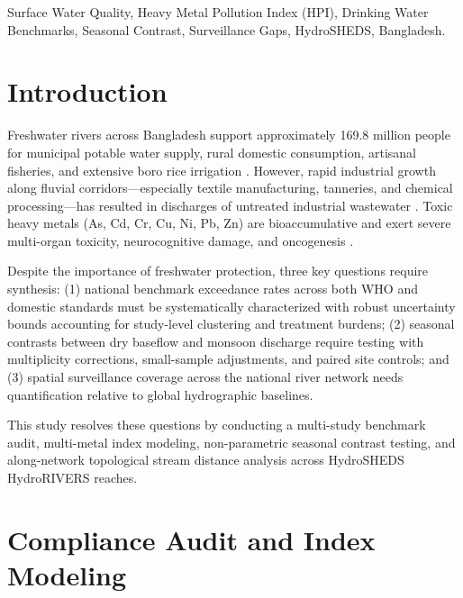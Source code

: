 \documentclass[conference]{IEEEtran}
\begin{document}
\begin{abstract}
surveillance coverage gaps along the Lower Meghna, Padma, and Jamuna river mainstems.
\end{abstract}

\begin{IEEEkeywords}
Surface Water Quality, Heavy Metal Pollution Index (HPI), Drinking Water Benchmarks, Seasonal Contrast, Surveillance Gaps, HydroSHEDS, Bangladesh.
\end{IEEEkeywords}

\section{Introduction}
Freshwater rivers across Bangladesh support approximately 169.8 million people \cite{BBS2022} for municipal potable water supply, rural domestic consumption, artisanal fisheries, and extensive boro rice irrigation \cite{Ali2021,Islam2015}. However, rapid industrial growth along fluvial corridors---especially textile manufacturing, tanneries, and chemical processing---has resulted in discharges of untreated industrial wastewater \cite{Islam2015}. Toxic heavy metals (As, Cd, Cr, Cu, Ni, Pb, Zn) are bioaccumulative and exert severe multi-organ toxicity, neurocognitive damage, and oncogenesis \cite{Jarup2003,Needleman2004}.

Despite the importance of freshwater protection, three key questions require synthesis: (1) national benchmark exceedance rates across both WHO and domestic standards must be systematically characterized with robust uncertainty bounds accounting for study-level clustering and treatment burdens; (2) seasonal contrasts between dry baseflow and monsoon discharge require testing with multiplicity corrections, small-sample adjustments, and paired site controls; and (3) spatial surveillance coverage across the national river network needs quantification relative to global hydrographic baselines.

This study resolves these questions by conducting a multi-study benchmark audit, multi-metal index modeling, non-parametric seasonal contrast testing, and along-network topological stream distance analysis across HydroSHEDS HydroRIVERS reaches.

\section{Compliance Audit and Index Modeling}
\end{document}
